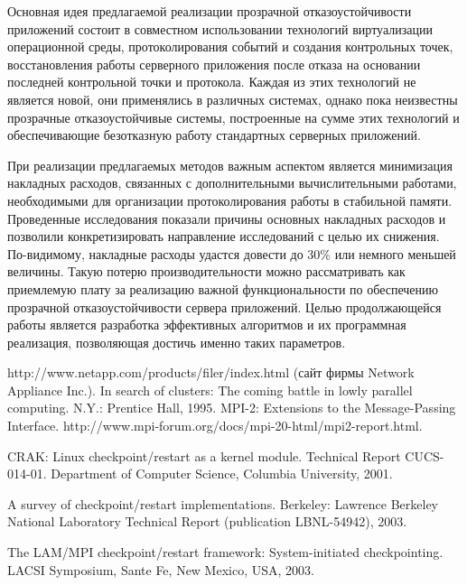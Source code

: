 \begin{multicols}{2}
Основная идея предлагаемой реализации прозрачной отказоустойчивости
приложений состоит в совместном использовании технологий виртуализации
операционной среды, протоколирования событий и создания контрольных
точек, восстановления работы серверного приложения после отказа на
основании последней контрольной точки и протокола. Каждая из этих
технологий не является новой, они применялись в различных системах, однако
пока неизвестны прозрачные отказоустойчивые сис\-те\-мы, построенные на
сумме этих технологий и обеспечивающие безотказную работу стандартных
серверных приложений.

При реализации предлагаемых методов важным аспектом является
минимизация накладных расходов,  связанных с дополнительными
вы\-чис\-литель\-ны\-ми работами, необходимыми для ор\-га\-низа\-ции
протоколирования  работы в стабильной памяти. Проведенные исследования
показали причины основных накладных расходов и позволили
конкретизировать направление исследований с \mbox{целью} их снижения.
По-видимому, накладные расходы удастся довести до 30\% или немного меньшей
величины. Такую потерю производительности можно рассматривать как
приемлемую плату за реализацию важной функцио\-нальности по обеспечению
прозрачной отказоустойчивости сервера приложений. Целью продолжающейся
работы является разработка эффективных алгоритмов и их программная
\mbox{реализация}, позволяющая достичь именно таких параметров.

{\small\frenchspacing
{%
\begin{thebibliography}{99}
{\sf
http://www.netapp.com/products/filer/index.html} (сайт фирмы Network Appliance Inc.).
In search of clusters: The coming battle in lowly parallel computing. N.Y.:
Prentice Hall, 1995.
MPI-2: Extensions to the Message-Passing Interface.
{\sf http://www.mpi-forum.org/docs/mpi-20-html/mpi2-report.html}.

CRAK: Linux checkpoint/restart as a kernel module. Technical Report
CUCS-014-01. Department of Computer Science, Columbia University,
2001.

A survey of checkpoint/restart implementations. Berkeley: Lawrence Berkeley
National Laboratory Technical Report (publication LBNL-54942), 2003.

The LAM/MPI checkpoint/restart framework: System-initiated checkpointing.
LACSI Symposium, Sante Fe, New Mexico, USA, 2003.


\end{thebibliography}}}
\end{multicols}
